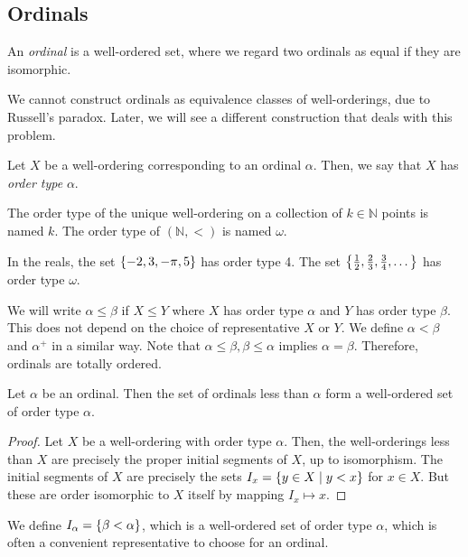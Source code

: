 \subsection{Ordinals}
\begin{definition}
    An \emph{ordinal} is a well-ordered set, where we regard two ordinals as equal if they are isomorphic.
\end{definition}
\begin{remark}
    We cannot construct ordinals as equivalence classes of well-orderings, due to Russell's paradox.
    Later, we will see a different construction that deals with this problem.
\end{remark}
\begin{definition}
    Let \( X \) be a well-ordering corresponding to an ordinal \( \alpha \).
    Then, we say that \( X \) has \emph{order type} \( \alpha \).
\end{definition}
The order type of the unique well-ordering on a collection of \( k \in \mathbb N \) points is named \( k \).
The order type of \( (\mathbb N, <) \) is named \( \omega \).
\begin{example}
    In the reals, the set \( \qty{-2, 3, -\pi, 5} \) has order type 4.
    The set \( \qty{\frac{1}{2}, \frac{2}{3}, \frac{3}{4}, \dots} \) has order type \( \omega \).
\end{example}
We will write \( \alpha \leq \beta \) if \( X \leq Y \) where \( X \) has order type \( \alpha \) and \( Y \) has order type \( \beta \).
This does not depend on the choice of representative \( X \) or \( Y \).
We define \( \alpha < \beta \) and \( \alpha^+ \) in a similar way.
Note that \( \alpha \leq \beta, \beta \leq \alpha \) implies \( \alpha = \beta \).
Therefore, ordinals are totally ordered.
\begin{proposition}
    Let \( \alpha \) be an ordinal.
    Then the set of ordinals less than \( \alpha \) form a well-ordered set of order type \( \alpha \).
\end{proposition}
\begin{proof}
    Let \( X \) be a well-ordering with order type \( \alpha \).
    Then, the well-orderings less than \( X \) are precisely the proper initial segments of \( X \), up to isomorphism.
    The initial segments of \( X \) are precisely the sets \( I_x = \qty{y \in X \mid y < x} \) for \( x \in X \).
    But these are order isomorphic to \( X \) itself by mapping \( I_x \mapsto x \).
\end{proof}
We define \( I_\alpha = \qty{\beta < \alpha} \), which is a well-ordered set of order type \( \alpha \), which is often a convenient representative to choose for an ordinal.
